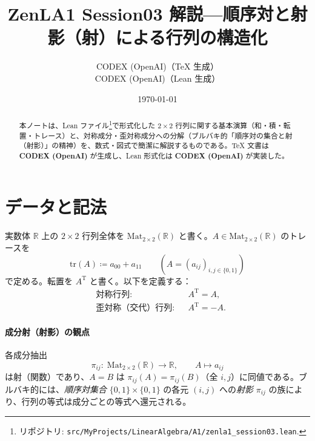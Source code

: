\documentclass[luatexja,ja=standard,a4paper,12pt]{bxjsarticle}
\title{ZenLA1 Session03 解説\;—\;順序対と射影（射）による行列の構造化}
\author{CODEX (OpenAI)（TeX 生成）\\ CODEX (OpenAI)（Lean 生成）}
\date{\today}
\newcommand{\R}{\mathbb{R}}
\newcommand{\Mat}{\mathrm{Mat}}
\newcommand{\MatTwo}{\Mat_{2\times 2}(\R)}
\newcommand{\tr}{\mathrm{tr}}
\newcommand{\TT}{\mathrm{T}}
\theoremstyle{definition}
\theoremstyle{plain}
\theoremstyle{remark}
\begin{document}
\maketitle

\begin{abstract}
本ノートは、Lean ファイル\footnote{リポジトリ: \texttt{src/MyProjects/LinearAlgebra/A1/zenla1\_session03.lean}.}で形式化した 2\,×\,2 行列に関する基本演算（和・積・転置・トレース）と、対称成分・歪対称成分への分解（ブルバキ的「順序対の集合と射（射影）」の精神）を、数式・図式で簡潔に解説するものである。TeX 文書は \textbf{CODEX (OpenAI)} が生成し、Lean 形式化は \textbf{CODEX (OpenAI)} が実装した。 
\end{abstract}

\section{データと記法}
実数体 $\R$ 上の $2\times 2$ 行列全体を $\MatTwo$ と書く。$A\in\MatTwo$ のトレースを
\[
  \tr(A) \coloneqq a_{00}+a_{11}\qquad (A=(a_{ij})_{i,j\in\{0,1\}})
\]
で定める。転置を $A^{\TT}$ と書く。以下を定義する：
\begin{align*}
  &\text{対称行列}:&& A^{\TT}=A,\\
  &\text{歪対称（交代）行列}:&& A^{\TT}=-A.
\end{align*}

\paragraph{成分射（射影）の観点} 各成分抽出
\[
  \pi_{ij}:\; \MatTwo\longrightarrow \R,\qquad A\longmapsto a_{ij}
\]
は射（関数）であり、$A=B$ は $\pi_{ij}(A)=\pi_{ij}(B)$（全 $i,j$）に同値である。ブルバキ的には、\emph{順序対集合} $\{0,1\}\times\{0,1\}$ の各元 $(i,j)$ への\emph{射影} $\pi_{ij}$ の族により、行列の等式は成分ごとの等式へ還元される。

\begin{center}
\end{center}
\end{document}
